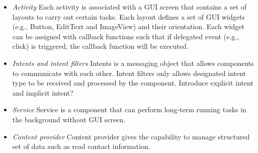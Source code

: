\begin{itemize}
	\item \textit{Activity} Each activity is associated with a GUI screen that contains a set of layouts 
	to carry out certain tasks. Each layout defines a set of GUI widgets (e.g., Button, 
	EditText and ImageView) and their orientation. Each widget can be assigned with callback 
	functions such that if delegated event (e.g., click) is triggered, the callback function will be 
	executed. 
	\item \textit{Intents and intent filters} Intents is a messaging object that allows components to 
	communicate with each other. Intent filters only allows designated intent type to be received 
	and processed by the component.  Introduce explicit intent and implicit intent?
	\item \textit{Service} Service is a component that can perform long-term running tasks in the 
	background without GUI screen.
	\item \textit{Content provider} Content provider gives the capability to manage structured set 
	of data such as read contact information. 
	
\end{itemize}
